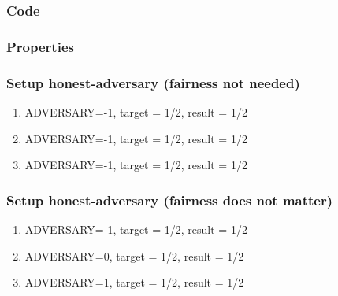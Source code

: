 \subsubsection{Code}



\subsubsection{Properties}




\subsubsection{Setup honest-adversary (fairness not needed)}

\begin{enumerate}
\item ADVERSARY=-1, target = 1/2, result = 1/2
\item ADVERSARY=-1, target = 1/2, result = 1/2
\item ADVERSARY=-1, target = 1/2, result = 1/2
\end{enumerate}

\subsubsection{Setup honest-adversary (fairness does not matter)}

\begin{enumerate}
\item ADVERSARY=-1, target = 1/2, result = 1/2
\item ADVERSARY=0, target = 1/2, result = 1/2
\item ADVERSARY=1, target = 1/2, result = 1/2
\end{enumerate}
